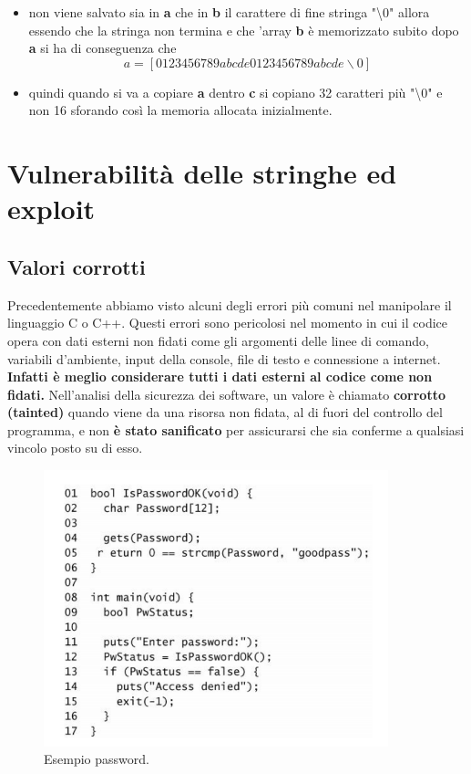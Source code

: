 \begin{itemize}
    \item non viene salvato sia in \textbf{a} che in \textbf{b} il carattere di fine
          stringa "\textbackslash0" allora essendo che la stringa non termina
          e che 'array \textbf{b} è memorizzato subito dopo \textbf{a} si ha di conseguenza che
          \[a = [0123456789abcde0123456789abcde\backslash 0]\]
    \item quindi quando si va a copiare \textbf{a} dentro \textbf{c} si copiano 32
          caratteri più "\textbackslash0" e non 16 sforando così la memoria allocata inizialmente.
\end{itemize}

\section{Vulnerabilità delle stringhe ed exploit}

\subsection{Valori corrotti}

Precedentemente abbiamo visto alcuni degli errori più comuni nel manipolare il
linguaggio C o C++. Questi errori sono pericolosi nel momento in cui il codice opera
con dati esterni non fidati come gli argomenti delle linee di comando, variabili
d'ambiente, input della console, file di testo e connessione a internet.
\textbf{Infatti è meglio considerare tutti i dati esterni al codice come non fidati. }
Nell'analisi della sicurezza dei software, un valore è
chiamato \textbf{corrotto (tainted)} quando viene da una risorsa non fidata, al di
fuori del controllo del programma, e non \textbf{è stato sanificato} per assicurarsi
che sia conferme a qualsiasi vincolo posto su di esso.

\begin{figure}[H]
    \centering
    \includegraphics[width=10cm, keepaspectratio]{capitoli/secure_coding/img/cap_2/password_example.png}
    \caption{Esempio password.}\label{fig:password}
\end{figure}


